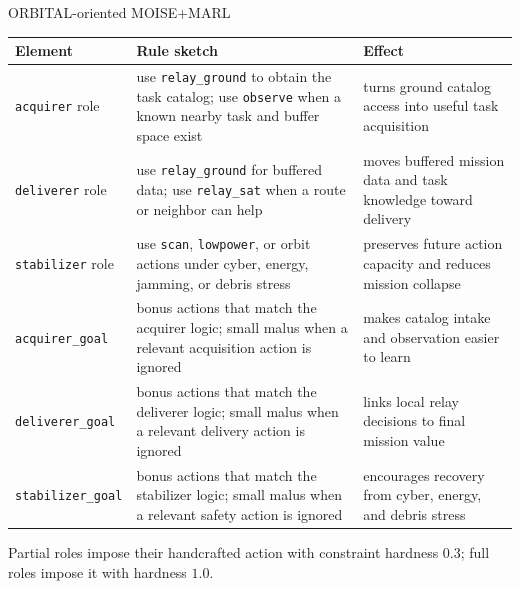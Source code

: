 \documentclass[aspectratio=169]{beamer}
\begin{document}
\begin{frame}{ORBITAL-oriented MOISE+MARL}

  \tiny
  \setlength{\tabcolsep}{3.5pt}
  \renewcommand{\arraystretch}{1.08}
  \begin{tabularx}{\linewidth}{p{2.25cm} X X}
    \toprule
    Element & Rule sketch                                                                                                                 & Effect \\
    \midrule
    \texttt{acquirer} role
            & use \texttt{relay\_ground} to obtain the task catalog; use \texttt{observe} when a known nearby task and buffer space exist
            & turns ground catalog access into useful task acquisition                                                                             \\
    \texttt{deliverer} role
            & use \texttt{relay\_ground} for buffered data; use \texttt{relay\_sat} when a route or neighbor can help
            & moves buffered mission data and task knowledge toward delivery                                                                       \\
    \texttt{stabilizer} role
            & use \texttt{scan}, \texttt{lowpower}, or orbit actions under cyber, energy, jamming, or debris stress
            & preserves future action capacity and reduces mission collapse                                                                        \\
    \texttt{acquirer\_goal}
            & bonus actions that match the acquirer logic; small malus when a relevant acquisition action is ignored
            & makes catalog intake and observation easier to learn                                                                                 \\
    \texttt{deliverer\_goal}
            & bonus actions that match the deliverer logic; small malus when a relevant delivery action is ignored
            & links local relay decisions to final mission value                                                                                   \\
    \texttt{stabilizer\_goal}
            & bonus actions that match the stabilizer logic; small malus when a relevant safety action is ignored
            & encourages recovery from cyber, energy, and debris stress                                                                            \\
    \bottomrule
  \end{tabularx}

  \vspace{0.12cm}
  \small
  Partial roles impose their handcrafted action with constraint hardness $0.3$; full roles impose it with hardness $1.0$.

\end{frame}
\end{document}
